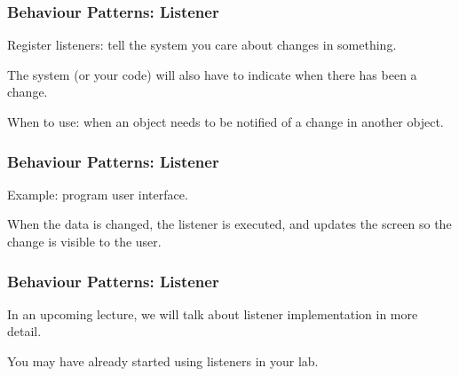\begin{frame}
\frametitle{Behaviour Patterns: Listener}
\begin{changemargin}{1cm}

Register listeners: tell the system you care about changes in something.

The system (or your code) will also have to indicate when there has been a change.

When to use: when an object needs to be notified of a change in another object.

\end{changemargin}
\end{frame}

\begin{frame}
\frametitle{Behaviour Patterns: Listener}
\begin{changemargin}{1cm}

Example: program user interface. 

When the data is changed, the listener is executed, and updates the screen so the change is visible to the user.

\end{changemargin}
\end{frame}

\begin{frame}
\frametitle{Behaviour Patterns: Listener}
\begin{changemargin}{1cm}
In an upcoming lecture, we will talk about listener implementation in more detail.

You may have already started using listeners in your lab.
\end{changemargin}
\end{frame}


